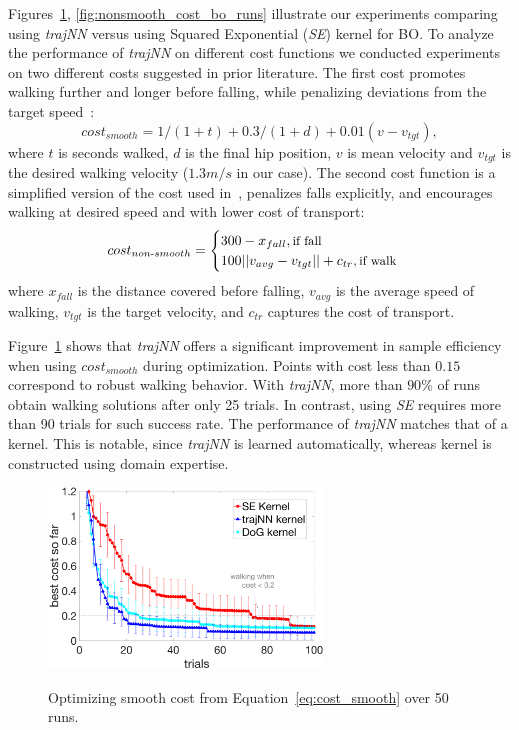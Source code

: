 Figures~\ref{fig:smooth_cost_bo_runs}, \ref{fig:nonsmooth_cost_bo_runs} illustrate our experiments comparing using \textit{trajNN} versus using Squared Exponential (\textit{SE}) kernel for BO. To analyze the performance of \textit{trajNN} on different cost functions we conducted experiments on two different costs suggested in prior literature. The first cost promotes walking further and longer before falling, while penalizing deviations from the target speed~\citep{rai2016sample}:
\begin{equation}
cost_{smooth} = 1/(1+t) + 0.3/(1+d) + 0.01(v-v_{tgt}),
\label{eq:cost_smooth}
\end{equation}
where $t$ is seconds walked, $d$ is the final hip position, $v$ is mean velocity and $v_{tgt}$ is the desired walking velocity ($1.3m/s$ in our case). 
The second cost function is a simplified version of the cost used in~\cite{song2015neural}, penalizes falls explicitly, and encourages walking at desired speed and with lower cost of transport:
\begin{equation}
cost_{non\text{-}smooth} = 		
    \begin{cases}
		300 - x_{fall} , \text{\small{if fall}} \\
		100 ||v_{avg} - v_{tgt}|| + c_{tr}, \text{\small{if walk}}\\
	\end{cases}
\label{eq:cost_nonsmooth}
\end{equation}
where $x_{fall}$ is the distance covered before falling, $v_{avg}$ is the average speed of walking, $v_{tgt}$ is the target velocity, and $c_{tr}$ captures the cost of transport.

Figure~\ref{fig:smooth_cost_bo_runs} shows that \textit{trajNN} offers a significant improvement in sample efficiency when using $cost_{smooth}$ during optimization. Points with cost less than $0.15$ correspond to robust walking behavior. With \textit{trajNN}, more than $90\%$ of runs obtain walking solutions after only 25 trials. In contrast, using \textit{SE} requires more than 90 trials for such success rate. The performance of \textit{trajNN} matches that of a \dogkernel kernel. This is notable, since \textit{trajNN} is learned automatically, whereas \dogkernel kernel is constructed using domain expertise.


\begin{figure}[t]
\centering
\caption{Optimizing smooth cost from Equation~\ref{eq:cost_smooth} over 50 runs.}
\includegraphics[width=0.65\textwidth]{img/smooth_cost_bo_runs}
\label{fig:smooth_cost_bo_runs}
\end{figure}

